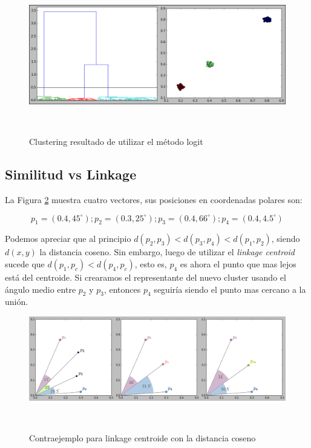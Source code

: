 \begin{figure}[h!]

\centering
\begin{minipage}[h]{0.8\textwidth}
    \includegraphics[width=\textwidth]{img/3pop_logit.png}
    \caption{Clustering resultado de utilizar el m\'etodo logit}
    \label{fig:3logit}
\end{minipage} ~

\end{figure}  


\subsection{Similitud vs Linkage}

La Figura \ref{fig:cos_cen} muestra cuatro vectores, sus posiciones en coordenadas
polares son: 

$$ p_1 = (0.4, 45^\circ);  p_2 = (0.3, 25^\circ); p_3 = (0.4, 66^\circ); p_4 = (0.4, 4.5^\circ)$$

Podemos apreciar que al principio $d(p_2,p_3) < d(p_3,p_4) < d(p_1,p_2)$, siendo
$d(x,y)$ la distancia coseno. Sin embargo, luego de utilizar el 
\textit{linkage centroid} sucede que $d(p_1,p_c) < d(p_4,p_c)$, esto es, $p_4$
es ahora el punto que mas lejos est\'a del centroide. Si crearamos el representante
del nuevo cluster usando el \'angulo medio entre $p_2$ y $p_3$, entonces $p_4$
seguir\'ia siendo el punto mas cercano a la uni\'on. \\

\begin{figure}[h!]
                                                                                                                        
\begin{minipage}[b]{\textwidth}
    \includegraphics[width=\textwidth]{img/cosine_centroid.png}
    \caption{Contraejemplo para linkage centroide con la distancia coseno}
    \label{fig:cos_cen}
\end{minipage} ~

\end{figure}  

